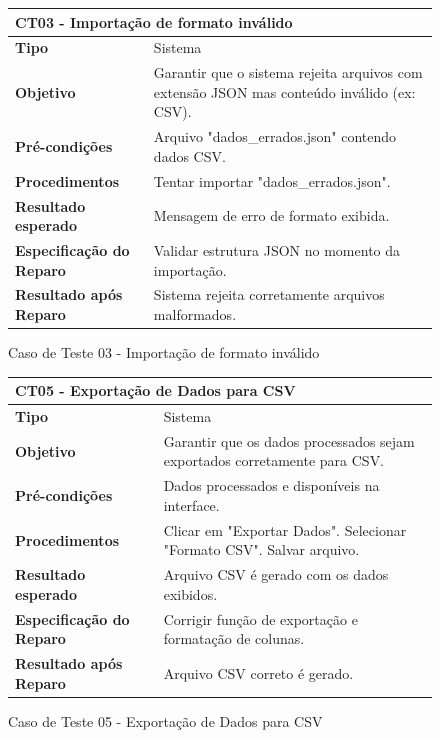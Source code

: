 \begin{figure}[H]
    \centering
\begin{longtable}{|p{}|p{}|}
\hline
\multicolumn{2}{|l|}{\textbf{CT03 - Importação de formato inválido}} \\
\hline
\textbf{Tipo} & Sistema \\
\hline
\textbf{Objetivo} & Garantir que o sistema rejeita arquivos com extensão JSON mas conteúdo inválido (ex: CSV). \\
\hline
\textbf{Pré-condições} & Arquivo "dados\_errados.json" contendo dados CSV. \\
\hline
\textbf{Procedimentos} & Tentar importar "dados\_errados.json". \\
\hline
\textbf{Resultado esperado} & Mensagem de erro de formato exibida. \\
\hline
\textbf{Especificação do Reparo} & Validar estrutura JSON no momento da importação. \\
\hline
\textbf{Resultado após Reparo} & Sistema rejeita corretamente arquivos malformados. \\
\hline
\end{longtable}
\caption{Caso de Teste 03 - Importação de formato inválido}
\label{fig_ct03_importacao_formato_invalido}
\end{figure}

\begin{figure}[H]
    \centering
\begin{longtable}{|p{}|p{}|}
\hline
\multicolumn{2}{|l|}{\textbf{CT05 - Exportação de Dados para CSV}} \\
\hline
\textbf{Tipo} & Sistema \\
\hline
\textbf{Objetivo} & Garantir que os dados processados sejam exportados corretamente para CSV. \\
\hline
\textbf{Pré-condições} & Dados processados e disponíveis na interface. \\
\hline
\textbf{Procedimentos} & Clicar em "Exportar Dados".  Selecionar "Formato CSV".  Salvar arquivo.  \\
\hline
\textbf{Resultado esperado} & Arquivo CSV é gerado com os dados exibidos. \\
\hline
\textbf{Especificação do Reparo} & Corrigir função de exportação e formatação de colunas. \\
\hline
\textbf{Resultado após Reparo} & Arquivo CSV correto é gerado. \\
\hline
\end{longtable}
\caption{Caso de Teste 05 - Exportação de Dados para CSV}
\label{fig_ct05_exportacao_dados_csv}
\end{figure}

